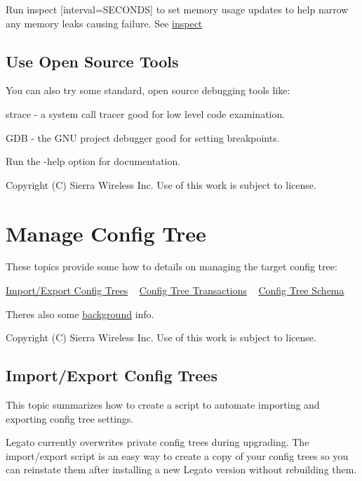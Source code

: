 Run {\ttfamily inspect \mbox{[}interval=S\+E\+C\+O\+N\+D\+S\mbox{]}} to set memory usage updates to help narrow any memory leaks causing failure. See \hyperlink{toolsTarget_inspect}{inspect}\hypertarget{how_to_debug_howToDebug_openTools}{}\subsection{Use Open Source Tools}\label{how_to_debug_howToDebug_openTools}
You can also try some standard, open source debugging tools like\+:
\begin{DoxyItemize}
\item {\ttfamily strace} -\/ a system call tracer good for low level code examination.
\item {\ttfamily G\+D\+B} -\/ the G\+N\+U project debugger good for setting breakpoints.
\end{DoxyItemize}

Run the -\/help option for documentation.





Copyright (C) Sierra Wireless Inc. Use of this work is subject to license. \hypertarget{howToConfigTree}{}\section{Manage Config Tree}\label{howToConfigTree}
These topics provide some how to details on managing the target config tree\+:

\hyperlink{howToConfigTreeImportExport}{Import/\+Export Config Trees} ~\newline
 \hyperlink{howToConfigTreeTransactions}{Config Tree Transactions} ~\newline
 \hyperlink{howToConfigTreeSchema}{Config Tree Schema}

There\textquotesingle{}s also some \hyperlink{basicConfig}{background} info.





Copyright (C) Sierra Wireless Inc. Use of this work is subject to license. \hypertarget{howToConfigTreeImportExport}{}\subsection{Import/\+Export Config Trees}\label{howToConfigTreeImportExport}
This topic summarizes how to create a script to automate importing and exporting config tree settings.

Legato currently overwrites private config trees during upgrading. The import/export script is an easy way to create a copy of your config trees so you can reinstate them after installing a new Legato version without rebuilding them.

